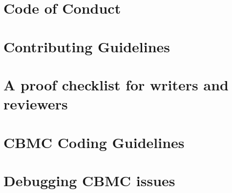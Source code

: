 \documentclass[twoside]{book}
\newcommand{\+}{\discretionary{\mbox{\scriptsize$\hookleftarrow$}}{}{}}
\begin{document}
\chapter{Code of Conduct}
\label{md_crt_aws_crt_cpp_crt_aws_c_common_verification_cbmc_templates__c_o_d_e__o_f__c_o_n_d_u_c_t}

\chapter{Contributing Guidelines}
\label{md_crt_aws_crt_cpp_crt_aws_c_common_verification_cbmc_templates__c_o_n_t_r_i_b_u_t_i_n_g}

\chapter{A proof checklist for writers and reviewers}
\label{md_crt_aws_crt_cpp_crt_aws_c_common_verification_cbmc_templates_training_material_checklist}

\chapter{CBMC Coding Guidelines}
\label{md_crt_aws_crt_cpp_crt_aws_c_common_verification_cbmc_templates_training_material__c_o_d_i_n_g__f_o_r__v_e_r_i_f_i_c_a_t_i_o_n}

\chapter{Debugging CBMC issues}
\label{md_crt_aws_crt_cpp_crt_aws_c_common_verification_cbmc_templates_training_material__d_e_b_u_g__c_b_m_c}

\end{document}

